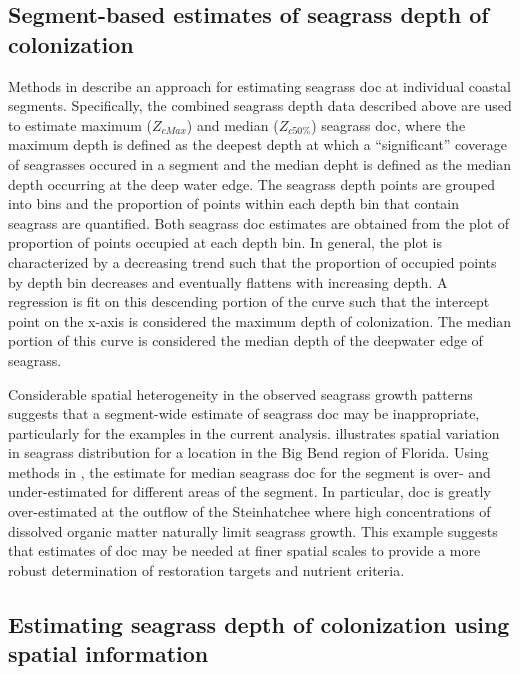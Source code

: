 \documentclass[letterpaper,12pt,oneside]{article}\usepackage[]{graphicx}\usepackage[]{color}
\begin{document}
\subsection{Segment-based estimates of seagrass depth of colonization}

Methods in  describe an approach for estimating seagrass \ac{doc} at individual coastal segments.  Specifically, the combined seagrass depth data described above are used to estimate maximum ($Z_{cMax}$) and median ($Z_{c50\%}$) seagrass \ac{doc}, where the maximum depth is defined as the deepest depth at which a ``significant'' coverage of seagrasses occured in a segment and the median depht is defined as the median depth occurring at the deep water edge. The seagrass depth points are grouped into bins and the proportion of points within each depth bin that contain seagrass are quantified.  Both seagrass \ac{doc} estimates are obtained from the plot of proportion of points occupied at each depth bin.  In general, the plot is characterized by a decreasing trend such that the proportion of occupied points by depth bin decreases and eventually flattens with increasing depth.  A regression is fit on this descending portion of the curve such that the intercept point on the x-axis is considered the maximum depth of colonization.  The median portion of this curve is considered the median depth of the deepwater edge of seagrass.   

Considerable spatial heterogeneity in the observed seagrass growth patterns suggests that a segment-wide estimate of seagrass \ac{doc} may be inappropriate, particularly for the examples in the current analysis.  illustrates spatial variation in seagrass distribution  for a location in the Big Bend region of Florida.  Using methods in , the estimate for median seagrass \ac{doc} for the segment is over- and under-estimated for different areas of the segment.  In particular, \ac{doc} is greatly over-estimated at the outflow of the Steinhatchee where high concentrations of dissolved organic matter naturally limit seagrass growth.  This example suggests that estimates of \ac{doc} may be needed at finer spatial scales to provide a more robust determination of restoration targets and nutrient criteria.

\subsection{Estimating seagrass depth of colonization using spatial information}
\end{document}
